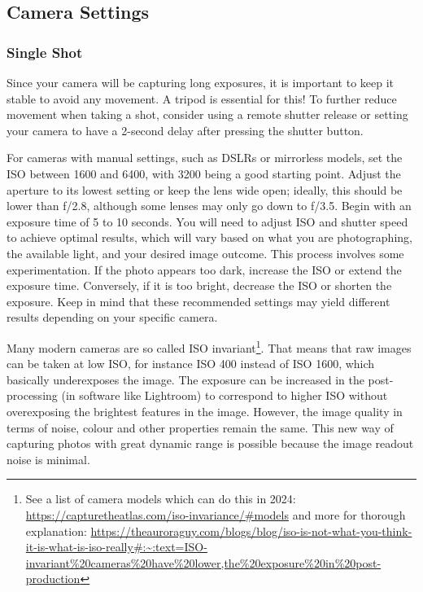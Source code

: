 \documentclass{article}
\begin{document}
\subsection{Camera Settings}
\subsubsection{Single Shot}\label{ISOinvariance}
Since your camera will be capturing long exposures, it is important to keep it stable to avoid any movement. A tripod is essential for this! To further reduce movement when taking a shot, consider using a remote shutter release or setting your camera to have a 2-second delay after pressing the shutter button.

For cameras with manual settings, such as DSLRs or mirrorless models, set the ISO between 1600 and 6400, with 3200 being a good starting point. Adjust the aperture to its lowest setting or keep the lens wide open; ideally, this should be lower than f/2.8, although some lenses may only go down to f/3.5. Begin with an exposure time of 5 to 10 seconds. You will need to adjust ISO and shutter speed to achieve optimal results, which will vary based on what you are photographing, the available light, and your desired image outcome. This process involves some experimentation. If the photo appears too dark, increase the ISO or extend the exposure time. Conversely, if it is too bright, decrease the ISO or shorten the exposure. Keep in mind that these recommended settings may yield different results depending on your specific camera.

Many modern cameras are so called ISO invariant\footnote{See a list of camera models which can do this in 2024: \url{https://capturetheatlas.com/iso-invariance/\#models} and more for thorough explanation: \url{https://theauroraguy.com/blogs/blog/iso-is-not-what-you-think-it-is-what-is-iso-really\#:~:text=ISO-invariant\%20cameras\%20have\%20lower,the\%20exposure\%20in\%20post-production}}. That means that raw images can be taken at low ISO, for instance ISO 400 instead of ISO 1600, which basically underexposes the image. The exposure can be increased in the post-processing (in software like Lightroom) to correspond to higher ISO without overexposing the brightest features in the image. However, the image quality in terms of noise, colour and other properties remain the same. This new way of capturing photos with great dynamic range is possible because the image readout noise is minimal.
\end{document}

